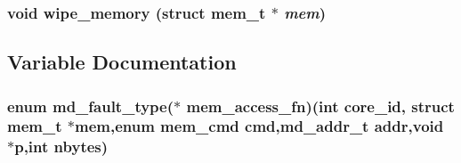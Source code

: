 \subsubsection[{wipe\_\-memory}]{\setlength{\rightskip}{0pt plus 5cm}void wipe\_\-memory (struct {\bf mem\_\-t} $\ast$ {\em mem})}\label{memory_8h_242fb835e054dfbb5a4a7e0d783ff72c}




\subsection{Variable Documentation}
\subsubsection[{mem\_\-access\_\-fn}]{\setlength{\rightskip}{0pt plus 5cm}enum {\bf md\_\-fault\_\-type}($\ast$ {\bf mem\_\-access\_\-fn})(int core\_\-id, struct {\bf mem\_\-t} $\ast$mem,enum {\bf mem\_\-cmd} cmd,{\bf md\_\-addr\_\-t} addr,void $\ast$p,int nbytes)}\label{memory_8h_b19d1d345069394f94dedcfe12c3d96a}


